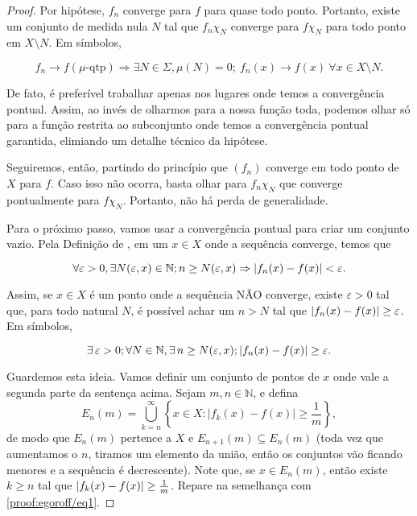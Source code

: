 \begin{proof}
    Por hipótese, $f_n$ converge para $f$ para quase todo ponto. Portanto, existe um conjunto de medida nula $N$ tal que $f_n\chi_N$ converge para $f\chi_N$ para todo ponto em $X\setminus N$. Em símbolos,

    \begin{equation*}
        f_n \rightarrow f (\mu \text{-qtp}) \Rightarrow \exists N\in \Sigma, \mu (N)=0; \ f_n(x) \rightarrow f(x) \ \forall x\in X\setminus N.
    \end{equation*}

    De fato, é preferível trabalhar apenas nos lugares onde temos a convergência pontual. Assim, ao invés de olharmos para a nossa função toda, podemos olhar só para a função restrita ao subconjunto onde temos a convergência pontual garantida, elimiando um detalhe técnico da hipótese. 
    
    Seguiremos, então, partindo do princípio que $(f_n)$ converge em todo ponto de $X$ para $f$. Caso isso não ocorra, basta olhar para $f_n\chi_N$ que converge pontualmente para $f\chi_N$. Portanto, não há perda de generalidade.

    Para o próximo passo, vamos usar a convergência pontual para criar um conjunto vazio. Pela Definição de , em um $x\in X$ onde a sequência converge, temos que

    \begin{equation*}
        \forall \varepsilon >0, \exists N(\varepsilon, x) \in \mathbb{N} ; n\geq N(\varepsilon, x)\Rightarrow \left| f_n(x) - f(x) \right| < \varepsilon.
    \end{equation*}

    Assim, se $x\in X$ é um ponto onde a sequência NÃO converge, existe $\varepsilon>0$ tal que, para todo natural $N$, é possível achar um $n>N$ tal que $\left| f_n(x)-f(x) \right|\geq\varepsilon$. Em símbolos,

    \begin{equation}\label{proof:egoroff/eq1}
        \exists \, \varepsilon >0; \forall N \in \mathbb{N} , \exists \, n\geq N(\varepsilon, x); \left| f_n(x) - f(x) \right| \geq \varepsilon.
    \end{equation}
    
    Guardemos esta ideia. Vamos definir um conjunto de pontos de $x$ onde vale a segunda parte da sentença acima. Sejam $m, n \in \mathbb{N}$, e defina
    \begin{equation*}
        E_n(m) = \bigcup_{k=n}^{\infty} \left\{ x \in X : |f_k(x) - f(x)| \geq \frac{1}{m} \right\},
    \end{equation*}
    de modo que $E_n(m)$ pertence a $X$ e $E_{n+1}(m) \subseteq E_n(m)$ (toda vez que aumentamos o $n$, tiramos um elemento da união, então os conjuntos vão ficando menores e a sequência é decrescente). Note que, se $x\in E_n(m)$, então existe $k\geq n$ tal que $\left| f_k(x) - f(x) \right| \geq \frac{1}{m}$. Repare na semelhança com \eqref{proof:egoroff/eq1}.


\end{proof}
